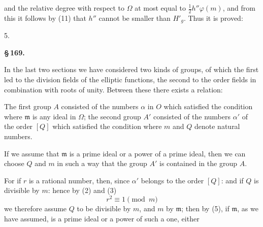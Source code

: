 
and the relative degree with respect to $\Omega$ at most equal to $\tfrac{1}{2} h''\varphi(m)$, and from this it follows by (11) that $h''$ cannot be smaller than $H'_g$. Thus it is proved:

5. 

\noindent\textbf{\S\,169.\qquad {}}

In the last two sections we have considered two kinds of groups, of which the first led to the division fields of the elliptic functions, the second to the order fields in combination with roots of unity. Between these there exists a relation:

The first group $A$ consisted of the numbers $\alpha$ in $O$ which satisfied the condition
where $\mathfrak{m}$ is any ideal in $\Omega$; the second group $A'$ consisted of the numbers $\alpha'$ of the order $[Q]$ which satisfied the condition
where $m$ and $Q$ denote natural numbers.

If we assume that $\mathfrak{m}$ is a prime ideal or a power of a prime ideal, then we can choose $Q$ and $m$ in such a way that the group $A'$ is contained in the group $A$.

For if $r$ is a rational number, then, since $\alpha'$ belongs to the order $[Q]$:
and if $Q$ is divisible by $m$:
hence by (2) and (3)
\[
r^2 \equiv 1 \pmod{m}
\]
we therefore assume $Q$ to be divisible by $m$, and $m$ by $\mathfrak{m}$; then by (5), if $\mathfrak{m}$, as we have assumed, is a prime ideal or a power of such a one, either
